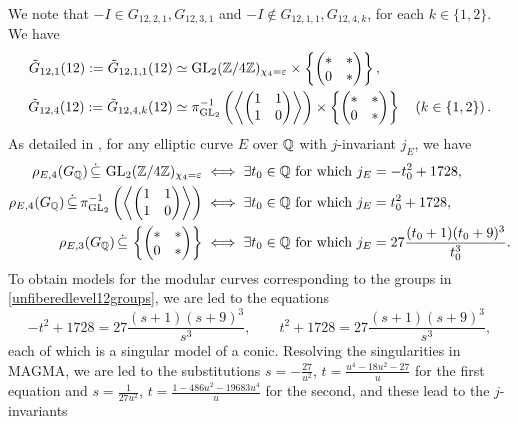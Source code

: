 We note that $-I \in G_{12,2,1}, G_{12,3,1}$ and $-I \notin G_{12,1,1}, G_{12,4,k}$, for each $k \in \{ 1, 2 \}$. We have
\begin{equation} \label{unfiberedlevel12groups}
\begin{split}
\tilde{G}_{12,1}(12) := \tilde{G}_{12,1,1}(12) &\simeq \operatorname{GL}_2(\mathbb{Z}/4\mathbb{Z})_{\chi_4 = \varepsilon} \times \left\{ \begin{pmatrix} * & * \\ 0 & * \end{pmatrix} \right\}, \\
\tilde{G}_{12,4}(12) := \tilde{G}_{12,4,k}(12) &\simeq \pi_{\operatorname{GL}_2}^{-1} \left( \left\langle \begin{pmatrix} 1 & 1 \\ 1 & 0 \end{pmatrix} \right\rangle \right) \times \left\{ \begin{pmatrix} * & * \\ 0 & * \end{pmatrix} \right\} \quad \left( k \in \{1, 2 \} \right).
\end{split}
\end{equation}
As detailed in \cite{sutherlandzywina}, for any elliptic curve $E$ over $\mathbb{Q}$ with $j$-invariant $j_E$, we have
\[
\begin{split}
\rho_{E,4}(G_{\mathbb{Q}}) \, \dot\subseteq \, \operatorname{GL}_2(\mathbb{Z}/4\mathbb{Z})_{\chi_4 = \varepsilon} \; &\Longleftrightarrow \; \exists t_0 \in \mathbb{Q} \text{ for which } j_E = -t_0^2 + 1728, \\
\rho_{E,4}(G_{\mathbb{Q}}) \, \dot\subseteq \, \pi_{\operatorname{GL}_2}^{-1} \left( \left\langle \begin{pmatrix} 1 & 1 \\ 1 & 0 \end{pmatrix} \right\rangle \right) \; &\Longleftrightarrow \; \exists t_0 \in \mathbb{Q} \text{ for which } j_E = t_0^2 + 1728, \\
\rho_{E,3}(G_{\mathbb{Q}}) \, \dot\subseteq \, \left\{ \begin{pmatrix} * & * \\ 0 & * \end{pmatrix} \right\} \; &\Longleftrightarrow \; \exists t_0 \in \mathbb{Q} \text{ for which } j_E = 27 \frac{(t_0+1)(t_0+9)^3}{t_0^3}.
\end{split}
\]
To obtain models for the modular curves corresponding to the groups in \eqref{unfiberedlevel12groups}, we are led to the equations
\[
-t^2 + 1728 = 27\frac{(s+1)(s+9)^3}{s^3}, \quad\quad t^2 + 1728 = 27\frac{(s+1)(s+9)^3}{s^3},
\]
each of which is a singular model of a conic. Resolving the singularities in MAGMA, we are led to the substitutions $s = - \frac{27}{u^2}$, $t = \frac{u^4 - 18u^2 - 27}{u}$ for the first equation and $s = \frac{1}{27u^2}$, $t = \frac{1-486u^2 - 19683u^4}{u}$ for the second, and these lead to the $j$-invariants
